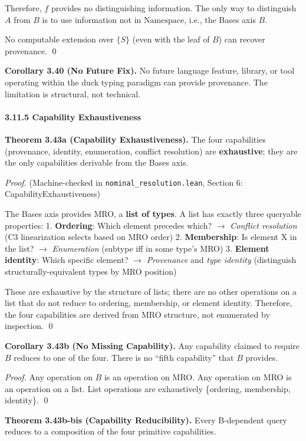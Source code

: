 Therefore, \(f\) provides no distinguishing information. The only way to
distinguish \(A\) from \(B\) is to use information not in
\(\text{Namespace}\), i.e., the Bases axis \(B\).

No computable extension over \(\{S\}\) (even with the leaf of \(B\)) can recover provenance.
\qed

\textbf{Corollary 3.40 (No Future Fix).} No future language feature,
library, or tool operating within the duck typing paradigm can provide
provenance. The limitation is structural, not technical.

\paragraph{3.11.5 Capability
Exhaustiveness}\label{capability-exhaustiveness}

\textbf{Theorem 3.43a (Capability Exhaustiveness).} The four
capabilities (provenance, identity, enumeration, conflict resolution)
are \textbf{exhaustive}; they are the only capabilities derivable from
the Bases axis.

\emph{Proof.} (Machine-checked in \texttt{nominal\_resolution.lean},
Section 6: CapabilityExhaustiveness)

The Bases axis provides MRO, a \textbf{list of types}. A list has
exactly three queryable properties: 1. \textbf{Ordering}: Which element
precedes which? $\rightarrow$ \emph{Conflict resolution} (C3 linearization selects
based on MRO order) 2. \textbf{Membership}: Is element X in the list? $\rightarrow$
\emph{Enumeration} (subtype iff in some type's MRO) 3. \textbf{Element
identity}: Which specific element? $\rightarrow$ \emph{Provenance} and \emph{type
identity} (distinguish structurally-equivalent types by MRO position)

These are exhaustive by the structure of lists; there are no other
operations on a list that do not reduce to ordering, membership, or
element identity. Therefore, the four capabilities are derived from MRO
structure, not enumerated by inspection. \qed

\textbf{Corollary 3.43b (No Missing Capability).} Any capability claimed
to require \(B\) reduces to one of the four. There is no ``fifth
capability'' that \(B\) provides.

\emph{Proof.} Any operation on \(B\) is an operation on MRO. Any
operation on MRO is an operation on a list. List operations are
exhaustively \{ordering, membership, identity\}. \qed

\textbf{Theorem 3.43b-bis (Capability Reducibility).} Every B-dependent
query reduces to a composition of the four primitive capabilities.


